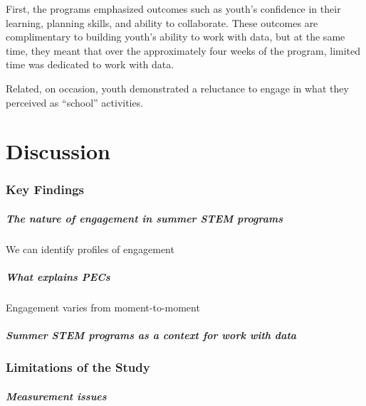 \documentclass[]{msu-thesis}
\let\oldparagraph\paragraph
\renewcommand{\paragraph}[1]{\oldparagraph{#1}\mbox{}}
\theoremstyle{definition}
\theoremstyle{definition}
\theoremstyle{definition}
\theoremstyle{remark}
\begin{document}
First, the programs emphasized outcomes such as youth's confidence in
their learning, planning skills, and ability to collaborate. These
outcomes are complimentary to building youth's ability to work with
data, but at the same time, they meant that over the approximately four
weeks of the program, limited time was dedicated to work with data.

Related, on occasion, youth demonstrated a reluctance to engage in what
they perceived as ``school'' activities.

\chapter{Discussion}\label{discussion}

\subsection{Key Findings}\label{key-findings}

\paragraph{The nature of engagement in summer STEM
programs}\label{the-nature-of-engagement-in-summer-stem-programs}

We can identify profiles of engagement

\paragraph{What explains PECs}\label{what-explains-pecs}

Engagement varies from moment-to-moment

\paragraph{Summer STEM programs as a context for work with
data}\label{summer-stem-programs-as-a-context-for-work-with-data}

\subsection{Limitations of the Study}\label{limitations-of-the-study}

\paragraph{Measurement issues}\label{measurement-issues}
\end{document}
